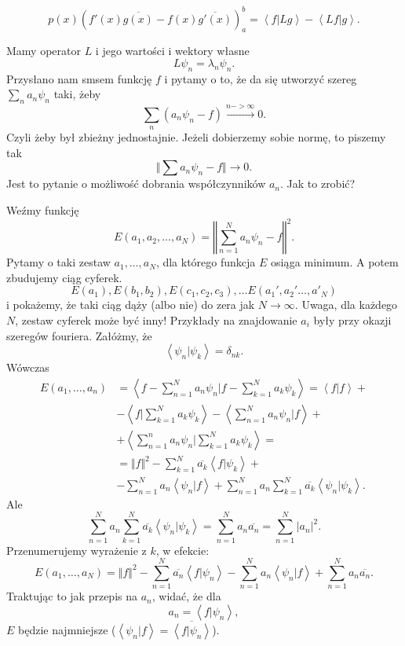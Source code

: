 \documentclass[../main.tex]{subfiles}
\begin{document}
		\[
				p(x) \left( f'(x)\overline{g(x)} - f(x) \overline{g'(x)}  \right) _a^b = \left<f|Lg \right>- \left<Lf|g \right>
		.\]
		\begin{pytanie}
				Mamy operator $L$ i jego wartości i wektory własne
				\[
				L \psi_n = \lambda_n \psi_n
				.\]
				Przysłano nam smsem funkcję $f$ i pytamy o to, że da się utworzyć szereg $\sum_n a_n \psi_n$ taki, żeby
				\[
						\sum_n (a_n\psi_n - f) \overset{n->\infty}{\longrightarrow} 0
				.\]
				Czyli żeby był zbieżny jednostajnie. Jeżeli dobierzemy sobie normę, to piszemy tak
				\[
				\Vert \sum a_n \psi_n - f \Vert \to 0
				.\]
				Jest to pytanie o możliwość dobrania współczynników $a_n$. Jak to zrobić?
		\end{pytanie}
		Weźmy funkcję
		\[
				E(a_1, a_2,...,a_N) = \left\Vert \sum_{n=1}^N a_n\psi_n - f \right\Vert ^2
		.\]
		Pytamy o taki zestaw $a_1,\dots,a_N$, dla którego funkcja  $E$ osiąga minimum. A potem zbudujemy ciąg cyferek.
		\[
				E(a_1),E(b_1,b_2),E(c_1,c_2,c_3),\dots E(a_1',a_2'\dots,a'_N)
		\]
		i pokażemy, że taki ciąg dąży (albo nie) do zera jak $N\to\infty$. Uwaga, dla każdego $N$, zestaw cyferek może być inny! Przykłady na znajdowanie $a_i$ były przy okazji szeregów fouriera. Załóżmy, że
		\[
		\left<\psi_n|\psi_k \right> = \delta_{nk}
		.\]
		Wówczas
		\begin{align*}
				E(a_1,\ldots,a_n) &= \left<f - \sum_{n=1}^N a_n\psi_n|f - \sum_{k=1}^Na_k\psi_k \right> = \left<f|f \right> + \\
				&- \left<f|\sum_{k=1}^Na_k\psi_k \right> - \left<\sum_{n=1}^Na_n\psi_n|f \right> + \\
				&+ \left<\sum_{n=1}^n a_n\psi_n | \sum_{k=1}^N a_k\psi_k \right> = \\
				&= \Vert f \Vert ^2 - \sum_{k=1}^N \overline{a_k} \left<f|\psi_k \right> +\\
				&- \sum_{n=1}^Na_n\left<\psi_n|f \right> + \sum_{n=1}^Na_n\sum_{k=1}^N\overline{a_k} \left<\psi_n|\psi_k \right>
		.\end{align*}
		Ale
		\[
		\sum_{n=1}^Na_n\sum_{k=1}^N\overline{a_k} \left<\psi_n|\psi_k \right> = \sum_{n=1}^Na_n\overline{a_n} = \sum_{n=1}^N |a_n|^2
		.\]
		Przenumerujemy wyrażenie z $k$, w efekcie:
		\[
				E(a_1,\ldots,a_N) = \Vert f \Vert ^2 - \sum_{n=1}^N \overline{a_n} \left<f|\psi_n \right> - \sum_{n=1}^Na_n\left<\psi_n|f \right> + \sum_{n=1}^N a_n \overline{a_n}
		.\]
		Traktując to jak przepis na $a_n$, widać, że dla
		\[
		a_n = \left<f|\psi_n \right>
		,\]
		$E$ będzie najmniejsze ($\left<\psi_n|f \right> = \overline{\left<f|\psi_n \right>} $).\\
\end{document}
